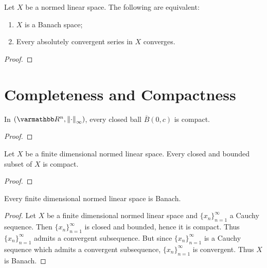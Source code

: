 \begin{proposition}\label{prop:banach-iff-series}
    Let $X$ be a normed linear space. The following are equivalent:
        \begin{enumerate}[label = (\arabic*),itemsep=1pt,topsep=3pt]
            \item $X$ is a Banach space;
            \item Every absolutely convergent series in $X$ converges.
        \end{enumerate}
\end{proposition}
    {\color{red} \begin{proof}
        
    \end{proof}}

\section{Completeness and Compactness}
\begin{lemma}
    In $(\bfR^n,\lnorm \cdot \rnorm_\infty)$, every closed ball $\overline{B}(0,c)$ is compact.
\end{lemma}
    {\color{red} \begin{proof}
        
    \end{proof}}

\begin{theorem}\label{thm:fd-closed-bdd-implies-cpt}
    Let $X$ be a finite dimensional normed linear space. Every closed and bounded subset of $X$ is compact.
\end{theorem}
    {\color{red} \begin{proof}
        
    \end{proof}}

\begin{corollary}\label{cor:fdnsl-is-banach}
    Every finite dimensional normed linear space is Banach.
\end{corollary}
    \begin{proof}
        Let $X$ be a finite dimensional normed linear space and $\{x_n\}_{n = 1}^\infty $ a Cauchy sequence. Then $\{x_n\}_{n= 1}^\infty$ is closed and bounded, hence it is compact. Thus $\{x_n\}_{n = 1}^\infty$ admits a convergent subsequence. But since $\{x_n\}_{n = 1}^\infty$ is a Cauchy sequence which admits a convergent subsequence, $\{x_n\}_{n = 1}^\infty$ is convergent. Thus $X$ is Banach.
    \end{proof}

